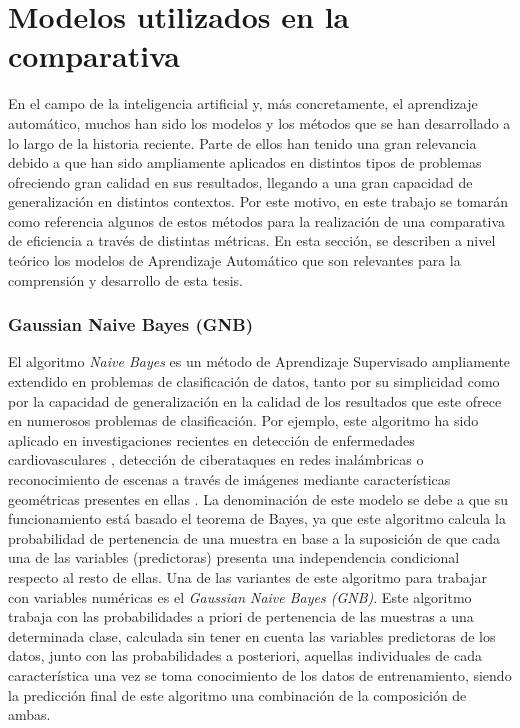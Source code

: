\documentclass{uathesis-es}
\begin{document}
	\section{Modelos utilizados en la comparativa}
	
	
	
	En el campo de la inteligencia artificial y, más concretamente, el aprendizaje automático, muchos han sido los modelos y los métodos que se han desarrollado a lo largo de la historia reciente. Parte de ellos han tenido una gran relevancia debido a que han sido ampliamente aplicados en distintos tipos de problemas ofreciendo gran calidad en sus resultados, llegando a una gran capacidad de generalización en distintos contextos. Por este motivo, en este trabajo se tomarán como referencia algunos de estos métodos para la realización de una comparativa de eficiencia a través de distintas métricas. En esta sección, se describen a nivel teórico los modelos de Aprendizaje Automático que son relevantes para la comprensión y desarrollo de esta tesis. 
	
	
	\subsubsection*{Gaussian Naive Bayes (GNB)}
	
	
	El algoritmo \textit{Naive Bayes} es un método de Aprendizaje Supervisado ampliamente extendido en problemas de clasificación de datos, tanto por su simplicidad como por la capacidad de generalización en la calidad de los resultados que este ofrece en numerosos problemas de clasificación. Por ejemplo, este algoritmo ha sido aplicado en investigaciones recientes en detección de enfermedades cardiovasculares \cite{Sai_Krishna_Reddy_2022}, detección de ciberataques en redes inalámbricas \cite{9817298} o reconocimiento de escenas a través de imágenes mediante características geométricas presentes en ellas \cite{rafique2019scene}. La denominación de este modelo se debe a que su funcionamiento está basado el teorema de Bayes, ya que este algoritmo calcula la probabilidad de pertenencia de una muestra en base a la suposición de que cada una de las variables (predictoras) presenta una independencia condicional respecto al resto de ellas. Una de las variantes de este algoritmo para trabajar con variables numéricas es el \textit{Gaussian Naive Bayes (GNB)}. Este algoritmo trabaja con las probabilidades a priori de pertenencia de las muestras a una determinada clase, calculada sin tener en cuenta las variables predictoras de los datos, junto con las probabilidades a posteriori, aquellas individuales de cada característica una vez se toma conocimiento de los datos de entrenamiento, siendo la predicción final de este algoritmo una combinación de la composición de ambas.
	
\end{document}
